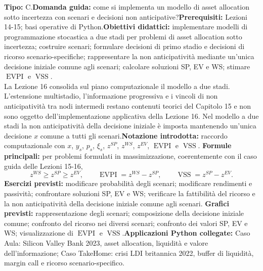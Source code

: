 \documentclass[12pt,a4paper]{article}%
\newcommand{\1}{\mathbf{1}}
\begin{document}
\textbf{Tipo:} C.\newline\textbf{Domanda guida:} come si implementa un modello
di asset allocation sotto incertezza con scenari e decisioni non
anticipative?\newline\textbf{Prerequisiti:} Lezioni 14-15; basi operative di
Python.\newline\textbf{Obiettivi didattici:} implementare modelli di programmazione
stocastica a due stadi per problemi di asset allocation sotto incertezza;
costruire scenari; formulare decisioni di primo stadio e decisioni di
ricorso scenario-specifiche; rappresentare la non anticipativit\`{a}
mediante un'unica decisione iniziale comune agli scenari; calcolare
soluzioni SP, EV e WS; stimare $\operatorname{EVPI}$ e
$\operatorname{VSS}$.\\La Lezione 16 consolida sul piano computazionale il modello a due stadi.
L'estensione multistadio, l'informazione progressiva e i vincoli di
non anticipativit\`{a} tra nodi intermedi restano contenuti teorici del Capitolo 15 e non sono oggetto dell'implementazione applicativa della
Lezione 16. Nel modello a due stadi la non anticipativit\`{a} della decisione
iniziale \`e imposta mantenendo un'unica decisione $x$ comune a tutti gli
scenari.\newline\textbf{Notazione introdotta:} raccordo computazionale con
$x$, $y_{s}$, $p_{s}$, $\xi_{s}$, $z^{SP}$, $z^{WS}$, $z^{EV}$,
$\operatorname{EVPI}$ e $\operatorname{VSS}$.\newline
\textbf{Formule principali:} per problemi formulati in massimizzazione,
coerentemente con il caso guida delle Lezioni 15-16,
\[
z^{WS}\geq z^{SP}\geq z^{EV},
\qquad
\operatorname{EVPI}=z^{WS}-z^{SP},
\qquad
\operatorname{VSS}=z^{SP}-z^{EV}.
\]
\textbf{Esercizi previsti:} modificare probabilit\`{a} degli scenari;
modificare rendimenti e passivit\`{a}; confrontare soluzioni SP, EV e WS;
verificare la fattibilit\`{a} del ricorso e la non anticipativit\`{a}
della decisione iniziale comune agli scenari.
\newline
\textbf{Grafici previsti:} rappresentazione degli scenari; composizione
della decisione iniziale comune; confronto del ricorso nei diversi scenari;
confronto dei valori SP, EV e WS; visualizzazione di
$\operatorname{EVPI}$ e $\operatorname{VSS}$.\newline\textbf{Applicazioni Python collegate:} Caso Aula: Silicon Valley Bank 2023, asset
allocation, liquidit\`{a} e valore dell'informazione; Caso TakeHome: crisi
LDI britannica 2022, buffer di liquidit\`{a}, margin call e ricorso
scenario-specifico.
\end{document}

